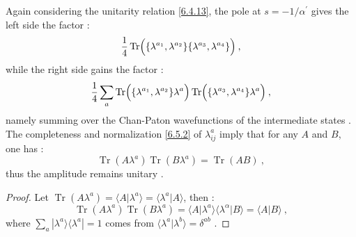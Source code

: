 Again considering the unitarity relation \eqref{6.4.13}, the pole at $s=-1 / \alpha^{\prime}$ gives the left side the factor :
\begin{equation}
	\frac{1}{4} \operatorname{Tr}\Bigl(\{\lambda^{a_{1}}, \lambda^{a_{2}}\} \{\lambda^{a_{3}}, \lambda^{a_{4}}\}\Bigr) \:,\label{6.5.7}
\end{equation}
while the right side gains the factor :
\begin{equation}
	\frac{1}{4} \sum_{a} \operatorname{Tr}\Bigl(\{\lambda^{a_{1}}, \lambda^{a_{2}}\} \lambda^{a}\Bigr) 
	\operatorname{Tr}\Bigl(\{\lambda^{a_{3}}, \lambda^{a_{4}}\} \lambda^{a}\Bigr) \:, \label{6.5.8}
\end{equation}
namely summing over the Chan-Paton wavefunctions of the intermediate states . The completeness and normalization \eqref{6.5.2} of $\lambda_{i j}^{a}$ imply that for any $A$ and $B$, one has :
\begin{equation}
	\operatorname{Tr}(A \lambda^{a}) \operatorname{Tr}(B \lambda^{a})=\operatorname{Tr}(A B) \:,  \label{6.5.9}
\end{equation}
thus the amplitude remains unitary .
\begin{tcolorbox}
	\begin{proof}
		Let $\operatorname{Tr}(A \lambda^{a})=\langle A \vert \lambda^{a}\rangle=\langle\lambda^{a}|A\rangle$, then :
		\[
		\operatorname{Tr}(A \lambda^{a}) \operatorname{Tr}(B \lambda^{a}) = 
		\langle A \vert \lambda^{a}\rangle\langle\lambda^{\alpha} \vert B\rangle=\langle A \vert B\rangle \:,
		\]
		where $\sum_{a}|\lambda^{a}\rangle\langle\lambda^{a}|=1$ comes from $\langle\lambda^{a} \vert \lambda^{b}\rangle= \delta^{a b}$ .
	\end{proof}	
\end{tcolorbox}



